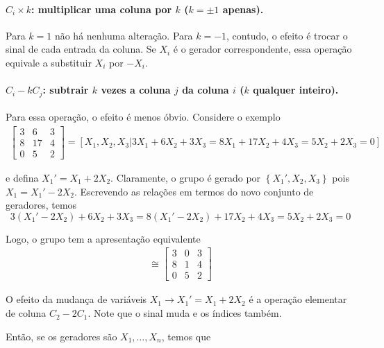 	\paragraph{$C_i\times k$: multiplicar uma coluna por $k$ ($k=\pm1$ apenas).} Para $k=1$ não há nenhuma alteração. Para $k=-1$, contudo, o efeito é trocar o sinal de cada entrada da coluna. Se $X_i$ é o gerador correspondente, essa operação equivale a substituir $X_i$ por $-X_i$.
	\paragraph{$C_i - kC_j$: subtrair $k$ vezes a coluna $j$ da coluna $i$ ($k$ qualquer inteiro).} Para essa operação, o efeito é menos óbvio. Considere o exemplo
	\begin{align*}
	\begin{bmatrix}
	3 & 6 & 3 \\
	8 & 17 & 4 \\
	0 & 5 & 2
	\end{bmatrix} = [X_1, X_2, X_3 \vert 3X_1 + 6X_2 + 3X_3 = 8X_1 + 17X_2 + 4X_3 = 5X_2 + 2X_3 = 0] 
	\end{align*}
	\par\vspace{0.3cm} e defina $X_1' = X_1+2X_2$. Claramente, o grupo é gerado por $\left\{ X_1', X_2, X_3 \right\}$ pois $X_1 = X_1' - 2X_2$. Escrevendo as relações em termos do novo conjunto de geradores, temos
	\begin{equation*}
	3(X_1' - 2X_2) + 6X_2  + 3X_3 = 8(X_1' - 2X_2) + 17X_2 + 4X_3 = 5X_2 + 2X_3 = 0
	\end{equation*} 
	\par\vspace{0.3cm} Logo, o grupo tem a apresentação equivalente
	\begin{align*}
	[X_1', X_2, X_3 \vert 3X_1' + 3X_3 = 8X_1' + X_2 + 4X_3 = 5X_2 + 2X_3 = 0] \cong \begin{bmatrix}
	3 & 0 & 3 \\
	8 & 1 & 4  \\
	0 & 5 & 2
	\end{bmatrix}
	\end{align*}
	\par\vspace{0.3cm} O efeito da mudança de variáveis $X_1\to X_1' = X_1 + 2X_2$ é a operação elementar de coluna $C_2 - 2C_1$. Note que o sinal muda e os índices também.
	\par\vspace{0.3cm} Então, se os geradores são $X_1, \dots, X_n$, temos que
